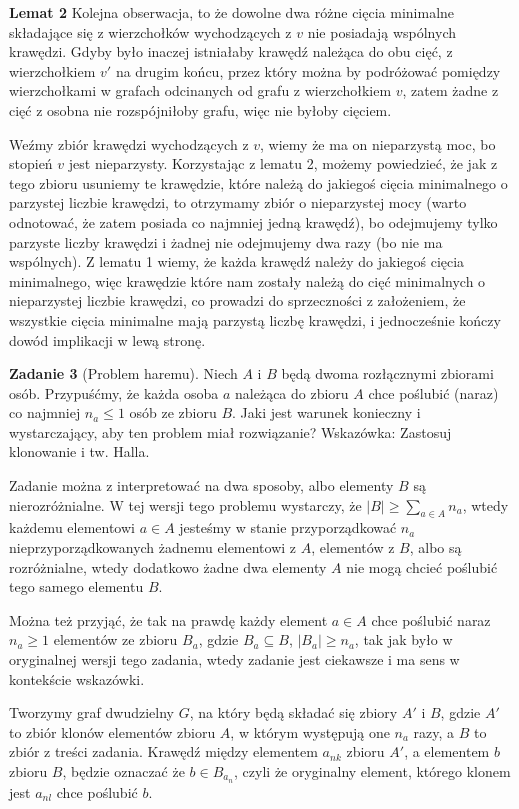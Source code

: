 \documentclass[12pt,a4paper]{article}
\begin{document}
\textbf{Lemat 2} Kolejna obserwacja, to że dowolne dwa różne cięcia minimalne składające się z wierzchołków wychodzących z \(v\) nie posiadają wspólnych krawędzi. Gdyby było inaczej istniałaby krawędź należąca do obu cięć, z wierzchołkiem \(v'\) na drugim końcu, przez który można by podróżować pomiędzy wierzchołkami w grafach odcinanych od grafu z wierzchołkiem \(v\), zatem żadne z cięć z osobna nie rozspójniłoby grafu, więc nie byłoby cięciem.

Weźmy zbiór krawędzi wychodzących z \(v\), wiemy że ma on nieparzystą moc, bo stopień \(v\) jest nieparzysty. Korzystając z lematu 2, możemy powiedzieć, że jak z tego zbioru usuniemy te krawędzie, które należą do jakiegoś cięcia minimalnego o parzystej liczbie krawędzi, to otrzymamy zbiór o nieparzystej mocy (warto odnotować, że zatem posiada co najmniej jedną krawędź), bo odejmujemy tylko parzyste liczby krawędzi i żadnej nie odejmujemy dwa razy (bo nie ma wspólnych). Z lematu 1 wiemy, że każda krawędź należy do jakiegoś cięcia minimalnego, więc krawędzie które nam zostały należą do cięć minimalnych o nieparzystej liczbie krawędzi, co prowadzi do sprzeczności z założeniem, że wszystkie cięcia minimalne mają parzystą liczbę krawędzi, i jednocześnie kończy dowód implikacji w lewą stronę. 

\vskip 0.5cm
\noindent
\textbf{Zadanie 3} (Problem haremu). Niech \(A\) i \(B\) będą dwoma rozłącznymi zbiorami osób. Przypuśćmy, że każda osoba \(a\) należąca do zbioru \(A\) chce poślubić (naraz) co najmniej \(n_a \leq 1\) osób ze zbioru \(B\). Jaki jest warunek konieczny i wystarczający, aby ten problem miał rozwiązanie? Wskazówka: Zastosuj klonowanie i tw. Halla.
\vskip 0.2cm

Zadanie można z interpretować na dwa sposoby, albo elementy \(B\) są nierozróżnialne. W tej wersji tego problemu wystarczy, że \(|B| \geq \sum_{a \in A} n_a \), wtedy każdemu elementowi \(a \in A\) jesteśmy w stanie przyporządkować \(n_a\) nieprzyporządkowanych żadnemu elementowi z \(A\),
elementów z \(B\), albo są rozróżnialne, wtedy dodatkowo żadne dwa elementy \(A\) nie mogą chcieć poślubić tego samego elementu \(B\).

Można też przyjąć, że tak na prawdę każdy element \(a \in A\) chce poślubić naraz \(n_a \geq 1\) elementów ze zbioru \(B_a\), gdzie \(B_a \subseteq B\), \( |B_a| \geq n_a \), tak jak było w oryginalnej wersji tego zadania, wtedy zadanie jest ciekawsze i ma sens w kontekście wskazówki.

Tworzymy graf dwudzielny \(G\), na który będą składać się zbiory \(A'\) i \(B\), gdzie \(A'\) to zbiór klonów elementów zbioru \(A\), w którym występują one \(n_a\) razy, a \(B\) to zbiór z treści zadania. Krawędź między elementem \(a_{nk}\) zbioru \(A'\), a elementem \(b\) zbioru \(B\), będzie oznaczać że \(b \in B_{a_n}\), czyli że oryginalny element, którego klonem jest \(a_{nl}\) chce poślubić \(b\).
\end{document}
